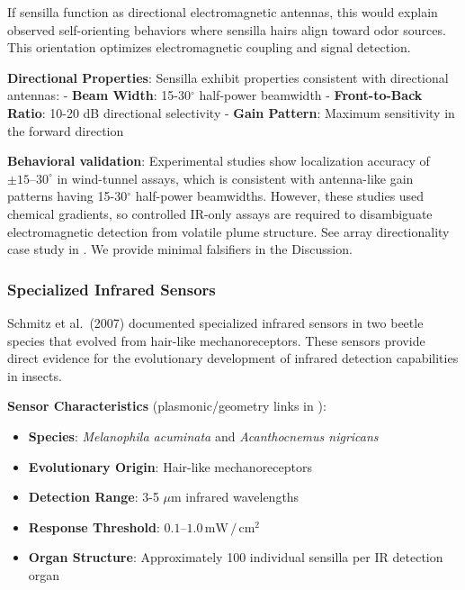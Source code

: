 \documentclass[
  13pt,
  a4paperpaper,
  12pt]{article}
\providecommand{\tightlist}{%
  \setlength{\itemsep}{0pt}\setlength{\parskip}{0pt}}
\begin{document}
If sensilla function as directional electromagnetic antennas, this would
explain observed self-orienting behaviors where sensilla hairs align
toward odor sources. This orientation optimizes electromagnetic coupling
and signal detection.

\textbf{Directional Properties}: Sensilla exhibit properties consistent
with directional antennas: - \textbf{Beam Width}: 15-30\(^{\circ}\)
half-power beamwidth - \textbf{Front-to-Back Ratio}: 10-20 dB
directional selectivity - \textbf{Gain Pattern}: Maximum sensitivity in
the forward direction

\textbf{Behavioral validation}: Experimental studies show localization
accuracy of \(\pm 15\text{--}30^{\circ}\) in wind-tunnel assays, which
is consistent with antenna-like gain patterns having 15-30\(^{\circ}\)
half-power beamwidths. However, these studies used chemical gradients,
so controlled IR-only assays are required to disambiguate
electromagnetic detection from volatile plume structure. See array
directionality case study in . We provide
minimal falsifiers in the Discussion.

\subsubsection{Specialized Infrared
Sensors}\label{specialized-infrared-sensors}

Schmitz et al.~(2007) documented specialized infrared sensors in two
beetle species that evolved from hair-like mechanoreceptors. These
sensors provide direct evidence for the evolutionary development of
infrared detection capabilities in insects.

\textbf{Sensor Characteristics} (plasmonic/geometry links in
):

\begin{itemize}
\tightlist
\item
  \textbf{Species}: \emph{Melanophila acuminata} and \emph{Acanthocnemus
  nigricans}
\item
  \textbf{Evolutionary Origin}: Hair-like mechanoreceptors
\item
  \textbf{Detection Range}: 3-5 \(\mu\mathrm{m}\) infrared wavelengths
\item
  \textbf{Response Threshold}:
  \(0.1\text{--}1.0\,\mathrm{mW}\,/\,\mathrm{cm}^2\)
\item
  \textbf{Organ Structure}: Approximately 100 individual sensilla per IR
  detection organ
\end{itemize}
\end{document}
